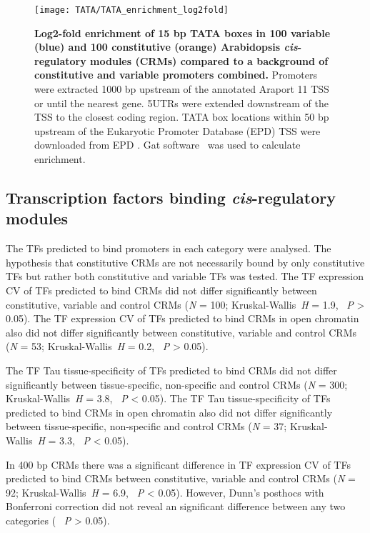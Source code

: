 \documentclass[../main.tex]{subfiles}
\begin{document}
\begin{figure}[!h]
	\begin{center}
		\capstart
		\texttt{[image: TATA/TATA\_enrichment\_log2fold]}
		\caption{
			\textbf{Log2\hyp{}fold enrichment of 15 bp TATA boxes in 100 variable (blue) and 100 constitutive (orange) Arabidopsis \textit{cis}\hyp{}regulatory modules (CRMs) compared to a background of constitutive and variable promoters combined.}
			Promoters were extracted 1000 bp upstream of the annotated Araport 11 \autocite{chengAraport11CompleteReannotation2017} TSS or until the nearest gene.
			5UTRs were extended downstream of the TSS to the closest coding region.
			TATA box locations within 50 bp upstream of the Eukaryotic Promoter Database (EPD) TSS were downloaded from EPD \autocite{dreosInfluenceRotationalNucleosome2016}.
			 Gat software~\autocite{hegerGATSimulationFramework2013} was used to calculate enrichment.
			\label{fig:tata-enrichment}
		}
	\end{center}
\end{figure}
\subsection{Transcription factors binding \textit{cis}\hyp{}regulatory modules}
The TFs predicted to bind promoters in each category were analysed.
The hypothesis that constitutive CRMs are not necessarily bound by only constitutive TFs but rather both constitutive and variable TFs was tested.
The TF expression CV of TFs predicted to bind CRMs did not differ significantly between constitutive, variable and control CRMs (\textit{N} = 100; Kruskal\hyp{}Wallis~\textit{H} = 1.9, ~\textit{P} \textgreater{} 0.05).
The TF expression CV of TFs predicted to bind CRMs in open chromatin also did not differ significantly between constitutive, variable and control CRMs (\textit{N} = 53; Kruskal\hyp{}Wallis~\textit{H} = 0.2, ~\textit{P} \textgreater{} 0.05).

The TF Tau tissue\hyp{}specificity of TFs predicted to bind CRMs did not differ significantly between tissue\hyp{}specific, non\hyp{}specific and control CRMs (\textit{N} = 300; Kruskal\hyp{}Wallis~\textit{H} = 3.8, ~\textit{P} \textless{} 0.05).
The TF Tau tissue\hyp{}specificity of TFs predicted to bind CRMs in open chromatin  also did not differ significantly between tissue\hyp{}specific, non\hyp{}specific and control CRMs (\textit{N} = 37; Kruskal\hyp{}Wallis~\textit{H} = 3.3, ~\textit{P} \textless{} 0.05).

In 400 bp CRMs there was a significant difference in TF expression CV of TFs predicted to bind CRMs between constitutive, variable and control CRMs (\textit{N} = 92; Kruskal\hyp{}Wallis~\textit{H} = 6.9, ~\textit{P} \textless{} 0.05).
However, Dunn's posthocs with Bonferroni correction did not reveal an significant difference between any two categories ( ~\textit{P} \textgreater{} 0.05).
\end{document}
